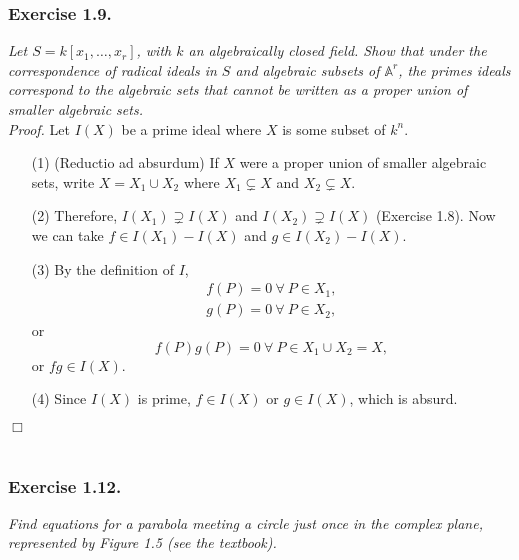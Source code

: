 \documentclass{article}
\begin{document}



\subsubsection*{Exercise 1.9.}
\emph{Let $S = k[x_1,\ldots,x_r]$, with $k$ an algebraically closed field.
Show that under the correspondence of radical ideals in $S$ and
algebraic subsets of $\mathbb{A}^r$,
the primes ideals correspond to the algebraic sets that
cannot be written as a proper union of smaller algebraic sets.} \\

\emph{Proof.}
Let $I(X)$ be a prime ideal where $X$ is some subset of $k^n$.
\begin{enumerate}
  \item[(1)]
  (Reductio ad absurdum)
  If $X$ were a proper union of smaller algebraic sets, write $X = X_1 \cup X_2$
  where $X_1 \subsetneq X$ and $X_2 \subsetneq X$.
  \item[(2)]
  Therefore, $I(X_1) \supsetneq I(X)$ and $I(X_2) \supsetneq I(X)$ (Exercise 1.8).
  Now we can take $f \in I(X_1)-I(X)$ and $g \in I(X_2)-I(X)$.
  \item[(3)]
  By the definition of $I$,
  \begin{align*}
    f(P) = 0 \: \forall \: P \in X_1, \\
    g(P) = 0 \: \forall \: P \in X_2,
  \end{align*}
  or
  \[
    f(P) g(P) = 0 \: \forall \: P \in X_1 \cup X_2 = X,
  \]
  or $fg \in I(X)$.
  \item[(4)]
  Since $I(X)$ is prime, $f \in I(X)$ or $g \in I(X)$,
  which is absurd.
\end{enumerate}
$\Box$ \\\\






\subsubsection*{Exercise 1.12.}
\emph{Find equations for a parabola meeting a circle just once
in the complex plane, represented by Figure 1.5 (see the textbook).} \\
\end{document}
